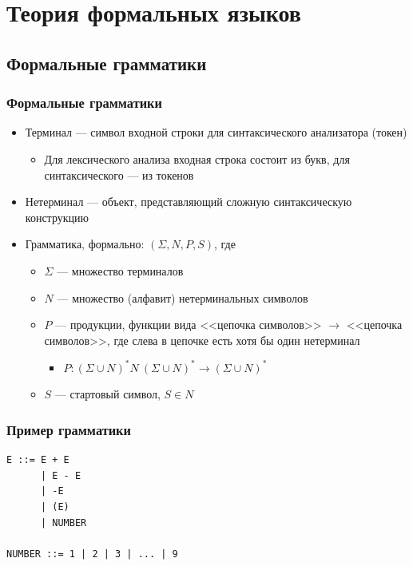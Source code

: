 \documentclass{../../slides-style}
\begin{document}
    \section{Теория формальных языков}

    \subsection{Формальные грамматики}

    \begin{frame}
        \frametitle{Формальные грамматики}
        \begin{itemize}
            \item Терминал --- символ входной строки для синтаксического анализатора (токен)
            \begin{itemize}
                \item Для лексического анализа входная строка состоит из букв, для синтаксического --- из токенов
            \end{itemize}
            \item Нетерминал --- объект, представляющий сложную синтаксическую конструкцию
            \item Грамматика, формально: $(\Sigma, N, P, S)$, где
            \begin{itemize}
                \item $\Sigma$ --- множество терминалов
                \item $N$ --- множество (алфавит) нетерминальных символов
                \item $P$ --- продукции, функции вида <<цепочка символов>> $\rightarrow$ <<цепочка символов>>, где слева в цепочке есть хотя бы один нетерминал
                \begin{itemize}
                    \item $P: (\Sigma \cup N)^* N\ (\Sigma \cup N)^* \rightarrow (\Sigma \cup N)^*$
                \end{itemize}
                \item $S$ --- стартовый символ, $S \in N$
            \end{itemize}
        \end{itemize}
    \end{frame}

    \begin{frame}[fragile]
        \frametitle{Пример грамматики}
        \begin{verbatim}
E ::= E + E
      | E - E
      | -E
      | (E)
      | NUMBER

NUMBER ::= 1 | 2 | 3 | ... | 9
        \end{verbatim}
    \end{frame}
\end{document}
